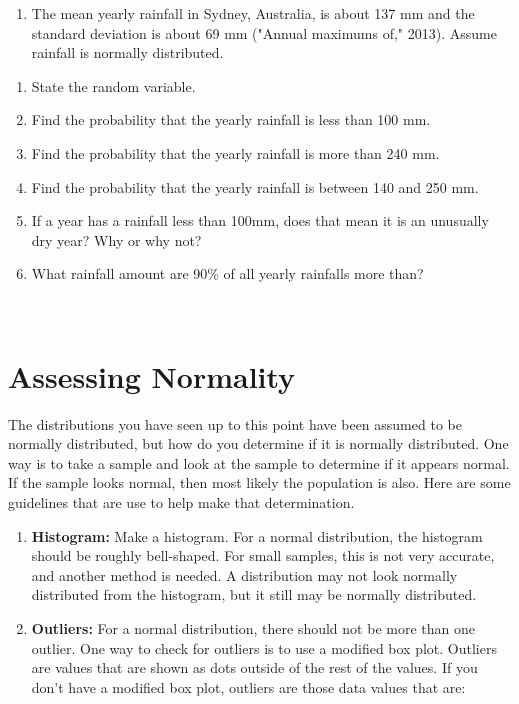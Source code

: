 \documentclass[]{book}
\providecommand{\tightlist}{%
  \setlength{\itemsep}{0pt}\setlength{\parskip}{0pt}}
\begin{document}
\begin{enumerate}
\def\labelenumi{\arabic{enumi}.}
\setcounter{enumi}{9}
\tightlist
\item
  The mean yearly rainfall in Sydney, Australia, is about 137 mm and
  the standard deviation is about 69 mm ("Annual maximums of,"
  2013). Assume rainfall is normally distributed.
\end{enumerate}

\begin{enumerate}
\def\labelenumi{\alph{enumi}.}
\item
  State the random variable.
\item
  Find the probability that the yearly rainfall is less than 100 mm.
\item
  Find the probability that the yearly rainfall is more than 240 mm.
\item
  Find the probability that the yearly rainfall is between 140 and
  250 mm.
\item
  If a year has a rainfall less than 100mm, does that mean it is an
  unusually dry year? Why or why not?
\item
  What rainfall amount are 90\% of all yearly rainfalls more than?
\end{enumerate}

\textbf{\\
}

\hypertarget{assessing-normality}{%
\section{Assessing Normality}\label{assessing-normality}}

The distributions you have seen up to this point have been assumed to be normally distributed, but how do you determine if it is normally distributed. One way is to take a sample and look at the sample to determine if it appears normal. If the sample looks normal, then most likely the population is also. Here are some guidelines that are use to help make that determination.

\begin{enumerate}
\def\labelenumi{\arabic{enumi}.}
\item
  \textbf{Histogram:} Make a histogram. For a normal distribution, the histogram should be roughly bell-shaped. For small samples, this is not very accurate, and another method is needed. A distribution may not look normally distributed from the histogram, but it still may be normally distributed.
\item
  \textbf{Outliers:} For a normal distribution, there should not be more than one outlier. One way to check for outliers is to use a modified box plot. Outliers are values that are shown as dots outside of the rest of the values. If you don't have a modified box plot, outliers are those data values that are:
\end{enumerate}
\end{document}
